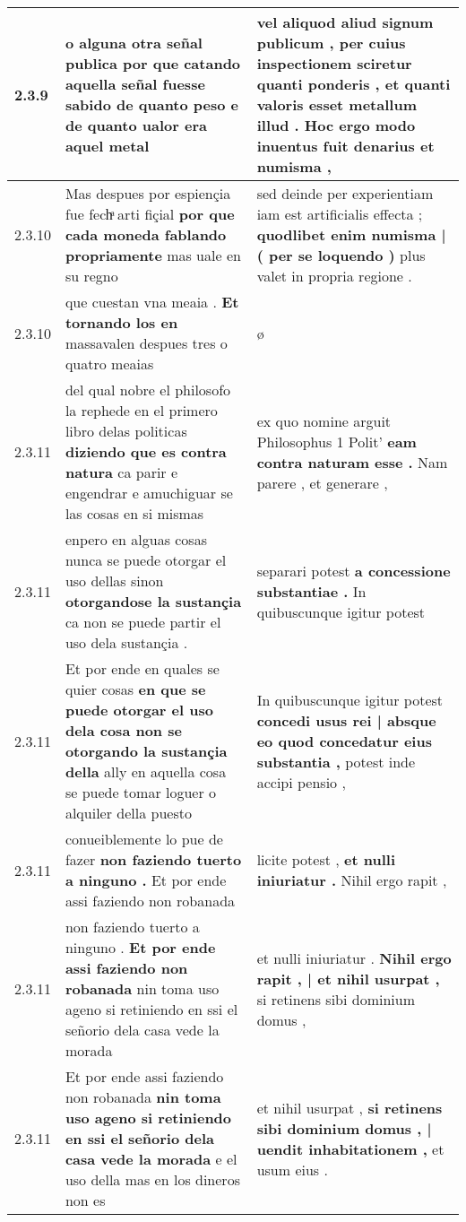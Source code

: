\begin{tabular}{|p{1cm}|p{6.5cm}|p{6.5cm}|}
2.3.9 & o alguna otra señal publica \textbf{ por que catando aquella señal fuesse sabido de quanto peso } e de quanto ualor era aquel metal & vel aliquod aliud signum publicum , \textbf{ per cuius inspectionem sciretur quanti ponderis , } et quanti valoris esset metallum illud . Hoc ergo modo inuentus fuit denarius et numisma , \\\hline
2.3.10 & Mas despues por espiençia fue fechͣ arti fiçial \textbf{ por que cada moneda fablando propriamente } mas uale en su regno & sed deinde per experientiam iam est artificialis effecta ; \textbf{ quodlibet enim numisma | ( per se loquendo ) } plus valet in propria regione . \\\hline
2.3.10 & que cuestan vna meaia . \textbf{ Et tornando los en } massavalen despues tres o quatro meaias & ø \\\hline
2.3.11 & del qual nobre el philosofo la rephede en el primero libro delas politicas \textbf{ diziendo que es contra natura } ca parir e engendrar e amuchiguar se las cosas en si mismas & ex quo nomine arguit Philosophus 1 Polit’ \textbf{ eam contra naturam esse . } Nam parere , et generare , \\\hline
2.3.11 & enpero en alguas cosas nunca se puede otorgar el uso dellas sinon \textbf{ otorgandose la sustançia } ca non se puede partir el uso dela sustançia . & separari potest \textbf{ a concessione substantiae . } In quibuscunque igitur potest \\\hline
2.3.11 & Et por ende en quales se quier cosas \textbf{ en que se puede otorgar el uso dela cosa non se otorgando la sustançia della } ally en aquella cosa se puede tomar loguer o alquiler della puesto & In quibuscunque igitur potest \textbf{ concedi usus rei | absque eo quod concedatur eius substantia , } potest inde accipi pensio , \\\hline
2.3.11 & conueiblemente lo pue de fazer \textbf{ non faziendo tuerto a ninguno . } Et por ende assi faziendo non robanada & licite potest , \textbf{ et nulli iniuriatur . } Nihil ergo rapit , \\\hline
2.3.11 & non faziendo tuerto a ninguno . \textbf{ Et por ende assi faziendo non robanada } nin toma uso ageno si retiniendo en ssi el señorio dela casa vede la morada & et nulli iniuriatur . \textbf{ Nihil ergo rapit , | et nihil usurpat , } si retinens sibi dominium domus , \\\hline
2.3.11 & Et por ende assi faziendo non robanada \textbf{ nin toma uso ageno si retiniendo en ssi el señorio dela casa vede la morada } e el uso della mas en los dineros non es & et nihil usurpat , \textbf{ si retinens sibi dominium domus , | uendit inhabitationem , } et usum eius . \\\hline

\end{tabular}
